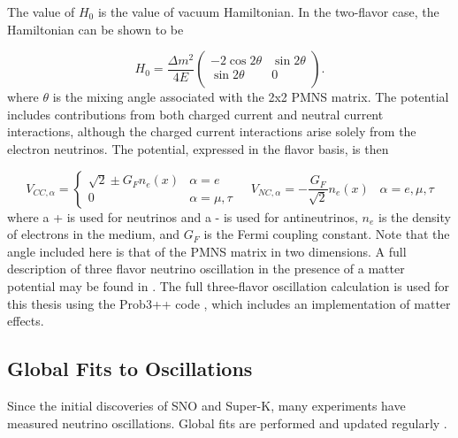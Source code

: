 The value of ${H_0}$ is the value of vacuum Hamiltonian.
In the two-flavor case, the Hamiltonian can be shown \cite{Review-PMNS,Review-PMNS2} to be

\begin{equation}
H_0 = \frac{\Delta m^2}{4E}
\begin{pmatrix}
- 2 \cos 2 \theta & \sin 2 \theta \\
\sin 2 \theta & 0 \\
\end{pmatrix}.
\end{equation}
%
where ${\theta}$ is the mixing angle associated with the 2x2 PMNS matrix.
The potential includes contributions from both charged current and neutral current interactions, although the charged current interactions arise solely from the electron neutrinos.
The potential, expressed in the flavor basis, is then

\begin{equation}
V_{CC,\alpha} = 
\begin{cases}
\sqrt{2} \pm G_F n_e \left( x\right) & \alpha = e \\
0 & \alpha = \mu, \tau
\end{cases}\ \ \ \ \ 
V_{NC,\alpha} = -\frac{G_F}{\sqrt{2}} n_e\left(x\right)\;\;\; \alpha = e, \mu, \tau
\end{equation}
%
where a + is used for neutrinos and a - is used for antineutrinos, ${n_e}$ is the density of electrons in the medium, and ${G_F}$ is the Fermi coupling constant.
Note that the angle included here is that of the PMNS matrix in two dimensions.
A full description of three flavor neutrino oscillation in the presence of a matter potential may be found in \cite{Review-PMNS,Review-PMNS2}.
The full three-flavor oscillation calculation is used for this thesis using the Prob3++ code \cite{Barger-Oscillations,prob3}, which includes an implementation of matter effects.









\subsection{Global Fits to Oscillations}
\label{subsec:global_fits}
Since the initial discoveries of SNO and Super-K, many experiments have measured neutrino oscillations. 
Global fits are performed and updated regularly \cite{NuFit_2.2, NuFit.org}.

